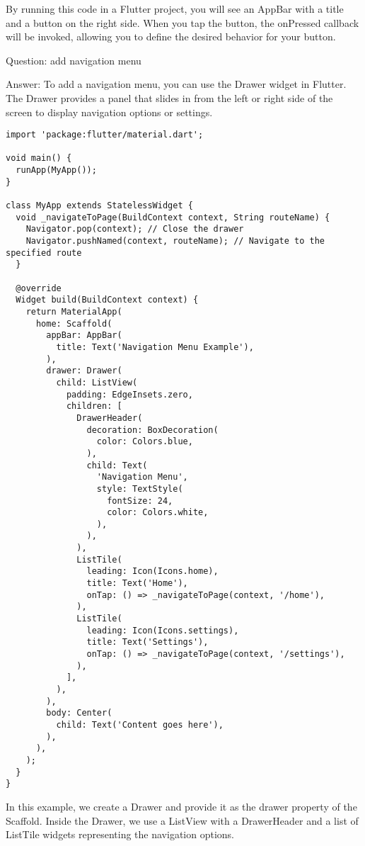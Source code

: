 By running this code in a Flutter project, you will see an AppBar with a title and a button on the right side. When 
you tap the button, the onPressed callback will be invoked, allowing you to define the desired behavior for your button.


Question: add navigation menu

Answer: To add a navigation menu, you can use the Drawer widget in Flutter. The Drawer provides a panel that slides 
in from the left or right side of the screen to display navigation options or settings.

\begin{lstlisting}
import 'package:flutter/material.dart';

void main() {
  runApp(MyApp());
}

class MyApp extends StatelessWidget {
  void _navigateToPage(BuildContext context, String routeName) {
    Navigator.pop(context); // Close the drawer
    Navigator.pushNamed(context, routeName); // Navigate to the specified route
  }

  @override
  Widget build(BuildContext context) {
    return MaterialApp(
      home: Scaffold(
        appBar: AppBar(
          title: Text('Navigation Menu Example'),
        ),
        drawer: Drawer(
          child: ListView(
            padding: EdgeInsets.zero,
            children: [
              DrawerHeader(
                decoration: BoxDecoration(
                  color: Colors.blue,
                ),
                child: Text(
                  'Navigation Menu',
                  style: TextStyle(
                    fontSize: 24,
                    color: Colors.white,
                  ),
                ),
              ),
              ListTile(
                leading: Icon(Icons.home),
                title: Text('Home'),
                onTap: () => _navigateToPage(context, '/home'),
              ),
              ListTile(
                leading: Icon(Icons.settings),
                title: Text('Settings'),
                onTap: () => _navigateToPage(context, '/settings'),
              ),
            ],
          ),
        ),
        body: Center(
          child: Text('Content goes here'),
        ),
      ),
    );
  }
}
\end{lstlisting}

In this example, we create a Drawer and provide it as the drawer property of the Scaffold. Inside the Drawer, we use 
a ListView with a DrawerHeader and a list of ListTile widgets representing the navigation options.

